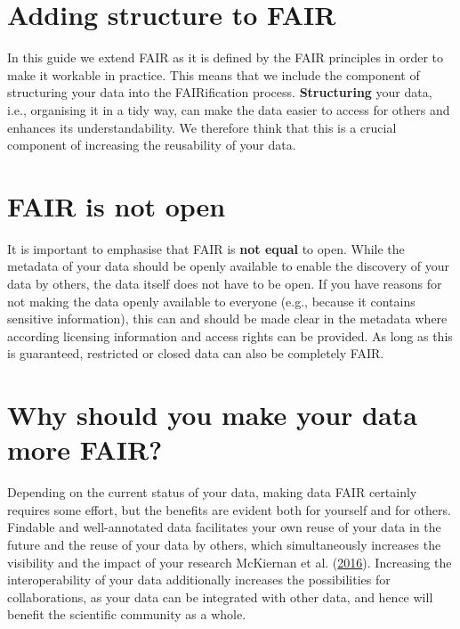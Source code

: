 \documentclass[
]{book}
\begin{document}
\hypertarget{adding-structure-to-fair}{%
\section{Adding structure to FAIR}\label{adding-structure-to-fair}}

In this guide we extend FAIR as it is defined by the FAIR principles in order to make it workable in practice. This means that we include the component of structuring your data into the FAIRification process. \textbf{Structuring} your data, i.e., organising it in a tidy way, can make the data easier to access for others and enhances its understandability. We therefore think that this is a crucial component of increasing the reusability of your data.

\hypertarget{fair-is-not-open}{%
\section{FAIR is not open}\label{fair-is-not-open}}

It is important to emphasise that FAIR is \textbf{not equal} to open. While the metadata of your data should be openly available to enable the discovery of your data by others, the data itself does not have to be open. If you have reasons for not making the data openly available to everyone (e.g., because it contains sensitive information), this can and should be made clear in the metadata where according licensing information and access rights can be provided. As long as this is guaranteed, restricted or closed data can also be completely FAIR.

\hypertarget{why-should-you-make-your-data-more-fair}{%
\section{Why should you make your data more FAIR?}\label{why-should-you-make-your-data-more-fair}}

Depending on the current status of your data, making data FAIR certainly requires some effort, but the benefits are evident both for yourself and for others. Findable and well-annotated data facilitates your own reuse of your data in the future and the reuse of your data by others, which simultaneously increases the visibility and the impact of your research McKiernan et al. (\protect\hyperlink{ref-McKiernan_2016}{2016}). Increasing the interoperability of your data additionally increases the possibilities for collaborations, as your data can be integrated with other data, and hence will benefit the scientific community as a whole.
\end{document}
